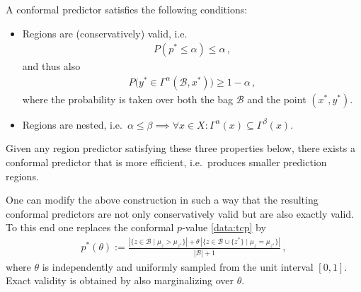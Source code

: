     \begin{property}[Optimality]
        A conformal predictor satisfies the following conditions:
        \begin{itemize}
            \item Regions are (conservatively) valid, i.e.
                \begin{gather}
                    P(p^*\leq\alpha)\leq\alpha\,,
                \end{gather}
                and thus also
                \begin{gather}
                    P\big(y^*\in\Gamma^\alpha(\mathcal{B},x^*)\big)\geq1-\alpha\,,
                \end{gather}
                where the probability is taken over both the bag $\mathcal{B}$ and the point $(x^*,y^*)$.
            \item Regions are nested, i.e.~$\alpha\leq\beta\implies\forall x\in X:\Gamma^\alpha(x)\subseteq\Gamma^\beta(x)$.
        \end{itemize}
        Given any region predictor satisfying these three properties below, there exists a conformal predictor that is more efficient, i.e.~produces smaller prediction regions.
    \end{property}

    \begin{property}\label{data:smooth_cp}
        One can modify the above construction in such a way that the resulting conformal predictors are not only conservatively valid but are also exactly valid. To this end one replaces the conformal $p$-value \eqref{data:tcp} by
        \begin{gather}
            p^*(\theta) := \frac{|\{z\in\mathcal{B}\mid\mu_z>\mu_{z^*}\}| + \theta\,|\{z\in\mathcal{B}\cup\{z^*\}\mid\mu_z=\mu_{z^*}\}|}{|\mathcal{B}|+1}\,,
        \end{gather}
        where $\theta$ is independently and uniformly sampled from the unit interval $[0,1]$. Exact validity is obtained by also marginalizing over $\theta$.
    \end{property}

